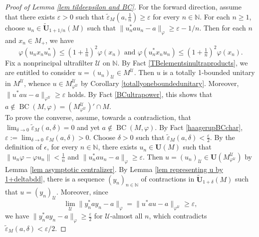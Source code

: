 \documentclass[12pt]{amsart}
\theoremstyle{definition}
\newcommand{\N}{\mathbb{N}}
\newcommand{\ep}{\varepsilon}
\def\cal{\mathcal}
\def\u{\mathsf 1}
\newcommand\cU{{\cal U}}
\def \u{\mathcal U}
\def\BC{\operatorname{BC}}
\begin{document}
\begin{proof}[Proof of Lemma \ref{lem tildeepsilon and BC}]
    For the forward direction, assume that there exists $\ep>0$ such that $\tilde{\ep}_M(a,\tfrac{1}{n})\ge \ep$ for every $n\in \N$.  For each $n\geq 1$, choose $u_n\in \tilde{\mathbf{U}}_{1+1/n}(M)$ such that $\|u_n^*au_n-a\|_{\varphi}\ge \ep-1/n$. 
    Then for each $n$ and $x_n\in M_+$, we have 
    \[\varphi(u_nx_nu_n^*)\le (1+\tfrac{1}{n})^2\varphi(x_n) \text{ and }
    \varphi(u_n^*x_nu_n)\le (1+\tfrac{1}{n
    })^2\varphi(x_n).\]
    Fix a nonprincipal ultrafilter $\u$ on $\N$. By Fact \ref{TBelementsinultraproducts}, we are entitled to consider $u=(u_n)_{\cU}\in M^{\cU}$. Then $u$ is a totally 1-bounded unitary in $M^{\cU}$, whence $u\in M^{\mathcal{U}}_{\varphi^{\mathcal{U}}}$ by Corollary \ref{totallyoneboundedunitary}.  Moreover, $\|u^*au-a\|_{\varphi^{\mathcal{U}}}\ge \ep$ holds. By Fact \ref{BCultrapower}, this shows that $a\notin \BC(M,\varphi)=(M^{\mathcal{U}}_{\varphi^{\mathcal{U}}})'\cap M$.\\
    
    To prove the converse, assume, towards a contradiction, that $\lim_{\delta\to 0}\tilde{\ep
    }_M(a,\delta)=0$ and yet $a\notin \BC(M,\varphi)$. By Fact \ref{haagerupBCchar}, $\displaystyle \ep:=\lim_{\delta\to 0}\ep_M(a,\delta)>0$. Choose $\delta>0$ such that $\tilde{\ep}_M(a,\delta)<\frac{\ep}{2}$. By the definition of $\epsilon$, for every $n\in \N$, there exists $u_n\in \mathbf{U}(M)$ such that $\|u_n\varphi-\varphi u_n\|<\frac{1}{n}$ and $\|u_n^*au_n-a\|_{\varphi}\ge \ep$. Then $u=(u_n)_{\mathcal{U}}\in \mathbf{U}(M^{\mathcal{U}}_{\varphi^{\mathcal{U}}})$ by Lemma \ref{lem asymptotic centralizer}. 
    By Lemma \ref{lem representing u by 1+deltabdd}, there is a sequence $(y_n)_{n\in \N}$ of contractions in $\tilde{\mathbf{U}}_{1+\delta}(M)$ such that $u=(y_n)_\u$.  Moreover, since $$\lim_{ \cU}\|y_n^*ay_n-a\|_{\varphi}=\|u^*au-a\|_{\varphi^{\cU}}\geq \varepsilon,$$ we have $\|y_n^*ay_n-a\|_{\varphi}\ge \frac{\ep}{2}$ for $\cU$-almost all $n$, which contradicts $\tilde{\ep}_M(a,\delta)<\ep/2$.
\end{proof}
\end{document}
